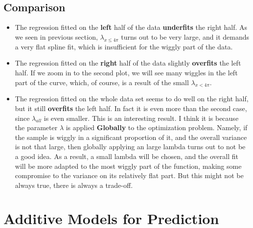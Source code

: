 \documentclass[11pt]{article}
\begin{document}
    \begin{center}
    \end{center}
    { \hspace*{\fill} \\}
    
    \begin{center}
    \end{center}
    { \hspace*{\fill} \\}
    
    \subsection{Comparison}\label{comparison}

\begin{itemize}
\item
  The regression fitted on the \textbf{left} half of the data
  \textbf{underfits} the right half. As we seen in previous section,
  \(\lambda_{x\leq 4\pi}\) turns out to be very large, and it demands a
  very flat spline fit, which is insufficient for the wiggly part of the
  data.
\item
  The regression fitted on the \textbf{right} half of the data slightly
  \textbf{overfits} the left half. If we zoom in to the second plot, we
  will see many wiggles in the left part of the curve, which, of course,
  is a result of the small \(\lambda_{x< 4\pi}\).
\item
  The regression fitted on the whole data set seems to do well on the
  right half, but it still \textbf{overfits} the left half. In fact it
  is even more than the second case, since \(\lambda_{all}\) is even
  smaller. This is an interesting result. I think it is because the
  parameter \(\lambda\) is applied \textbf{Globally} to the optimization
  problem. Namely, if the sample is wiggly in a significant proportion
  of it, and the overall variance is not that large, then globally
  applying an large lambda turns out to not be a good idea. As a result,
  a small lambda will be chosen, and the overall fit will be more
  adapted to the most wiggly part of the function, making some
  compromise to the variance on its relatively flat part. But this might
  not be always true, there is always a trade-off.
\end{itemize}

    \section{Additive Models for
Prediction}\label{additive-models-for-prediction}
\end{document}
